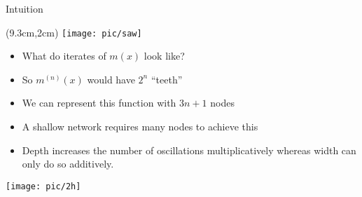 \documentclass[serif, aspectratio=169]{beamer}
\begin{document}
\begin{frame}{Intuition}
	\begin{textblock*}{5cm}(9.3cm,2cm) %
		\texttt{[image: pic/saw]}
	\end{textblock*}
	\begin{itemize}
		\item What do iterates of $m(x)$ look like?
		\item So $m^{(n)}(x)$ would have $2^n$ “teeth”
		\item We can represent this function with $3n+1$ \newline nodes 
		\item A shallow network requires many nodes to \newline achieve this
		\item Depth increases the number of oscillations \newline multiplicatively whereas width can only do so \newline additively.
	\end{itemize}
	\hspace{1.3cm}\texttt{[image: pic/2h]}
\end{frame}
\end{document}
